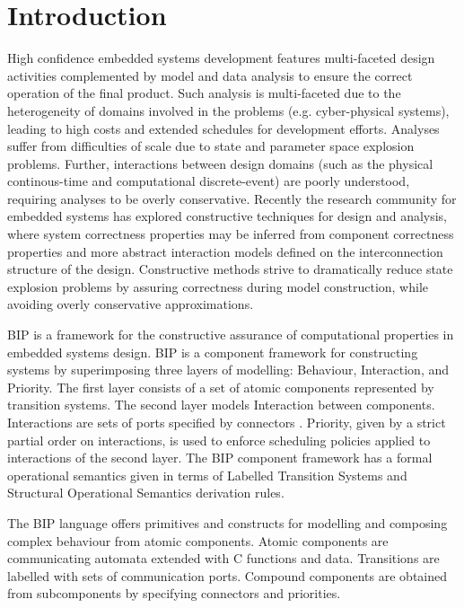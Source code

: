 \section{Introduction}

High confidence embedded systems development features multi-faceted design activities
complemented by model and data analysis to ensure the correct operation of the final
product.  Such analysis is multi-faceted due to the heterogeneity of domains 
involved in the problems (e.g. cyber-physical systems), leading to high costs and
extended schedules for development efforts.  Analyses suffer from difficulties
of scale due to state and parameter space explosion problems.  Further, interactions
between design domains (such as the physical continous-time and computational 
discrete-event) are poorly understood, requiring analyses to be overly conservative.
Recently the research community for embedded systems has explored 
constructive techniques for design and analysis, where system correctness properties
may be inferred from component correctness properties and more abstract interaction 
models defined on the interconnection structure of the design.  Constructive methods
strive to dramatically reduce state explosion problems by assuring correctness during
model construction, while avoiding overly conservative approximations.

BIP \cite{verif:bbs06} is a framework for the constructive assurance of computational 
properties in embedded systems design.  BIP is a component framework for constructing 
systems by superimposing three layers of modelling: Behaviour, Interaction, and Priority. 
The first layer consists of a set of atomic components represented by transition systems.  
The second layer models Interaction between components. Interactions are sets of ports 
specified by connectors \cite{verif:bs08,verif:bs09}. Priority, given by a strict partial 
order on interactions, is used to enforce scheduling policies applied to interactions of 
the second layer. The BIP component framework has a formal operational semantics given in 
terms of Labelled Transition Systems and Structural Operational Semantics derivation rules.

The BIP language offers primitives and constructs for modelling and composing complex 
behaviour from atomic components.  Atomic components are communicating automata extended 
with C functions and data. Transitions are labelled with sets of communication ports. 
Compound components are obtained from subcomponents by specifying connectors and 
priorities.

